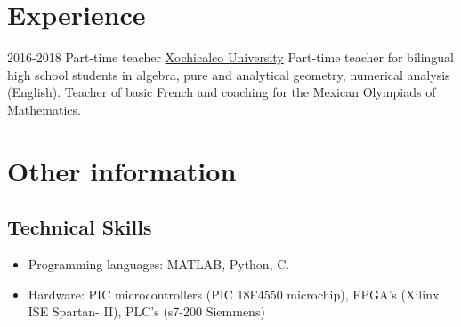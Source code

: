 \documentclass[letterpaper]{twentysecondcv} %
\begin{document}



\newpage
\section{Experience}

\begin{twenty} %
 \twentyitem
   		{2016-2018}
        {Part-time teacher}
        {\href{http://www.xochicalco.edu.mx} {Xochicalco University}}
        {Part-time teacher for bilingual high school students in algebra, pure and analytical geometry, numerical analysis (English). Teacher of basic French and coaching for the Mexican Olympiads of Mathematics.}
\end{twenty}


\section{Other information}

\subsection{Technical Skills}
\begin{itemize}
\item Programming languages: MATLAB, Python, C. 
\item Hardware: PIC microcontrollers (PIC 18F4550 microchip), FPGA's (Xilinx ISE Spartan-
II), PLC's (s7-200 Siemmens)
\end{itemize}
\end{document}
